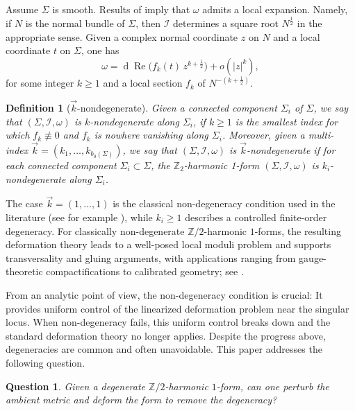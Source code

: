 \documentclass[11pt]{amsart}
\newcommand{\Z}{\mathbb{Z}}
\renewcommand{\d}{\operatorname{d}}
\renewcommand{\Re}{\operatorname{Re}}
\newtheorem{question}[theorem]{Question}
\newtheorem{definition}[theorem]{Definition}
\begin{document}
Assume \(\Sigma\) is smooth.
Results of \cite{Donaldson2021,Mazzeo1991} imply that \(\omega\) admits a local expansion. Namely, if $N$ is the normal bundle of $\Sigma$, then $\mathcal{I}$ determines a square root $N^{\frac{1}{2}}$ in the appropriate sense. Given a complex normal coordinate $z$ on $N$ and a local coordinate \(t\) on $\Sigma$, one has
\[
\omega = \d\Re\bigl(f_k(t)\, z^{k+\frac12}\bigr) + o\!\left(|z|^{k}\right),
\]
for some integer \(k\ge 1\) and a local section \(f_k\) of \(N^{-(k+\frac12)}\).

\begin{definition}[$\vec k$-nondegenerate]
	\label{def_k_nondegenerate}    Given a connected component $\Sigma_i$ of $\Sigma$, we say that \((\Sigma,\mathcal{I},\omega)\) is \emph{\(k\)-nondegenerate along $\Sigma_i$}, if \(k\geq 1\) is the smallest index for which \(f_k\not\equiv 0\) and \(f_k\) is nowhere vanishing along \(\Sigma_i\).
    Moreover, given a multi-index $\vec{k} = (k_1, \ldots, k_{b_0(\Sigma)})$, we say that  \((\Sigma,\mathcal{I},\omega)\) is \emph{\(\vec{k}\)-nondegenerate} if for each connected component $\Sigma_i \subset \Sigma$, the $\Z_2$-harmonic 1-form \((\Sigma,\mathcal{I},\omega)\) is \emph{\(k_i\)-nondegenerate} along $\Sigma_i$.
\end{definition}

The case \(\vec{k}=(1, \ldots, 1)\) is the classical non-degeneracy condition used in the literature (see for example \cite{Donaldson2021,Parker2026Deformations}), while \(k_i\geq 1\) describes a controlled finite-order degeneracy.
For classically non-degenerate \(\mathbb{Z}/2\)-harmonic \(1\)-forms, the resulting deformation theory leads to a well-posed local moduli problem and supports transversality and gluing arguments, with applications ranging from gauge-theoretic compactifications to calibrated geometry; see \cite{Donaldson2021,Parker2026Deformations,Yan2025Nondegenerate}.

From an analytic point of view, the non-degeneracy condition is crucial: It provides uniform control of the linearized deformation problem near the singular locus.
When non-degeneracy fails, this uniform control breaks down and the standard deformation theory no longer applies.
Despite the progress above, degeneracies are common and often unavoidable.
This paper addresses the following question.

\begin{question}\label{question_main}
	Given a degenerate \(\mathbb{Z}/2\)-harmonic \(1\)-form, can one perturb the ambient metric and deform the form to remove the degeneracy?
\end{question}
\end{document}
